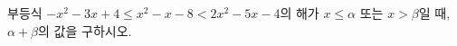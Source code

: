 \hspace*{2mm}\begin{minipage}[t]{\dimexpr\linewidth-2mm\relax}\vspace{0pt}
부등식 $-x^2-3x+4\le x^2-x-8<2x^2-5x-4$의 해가 $x\le \alpha$ 또는 $x>\beta$일 때, $\alpha+\beta$의 값을 구하시오.\end{minipage}
